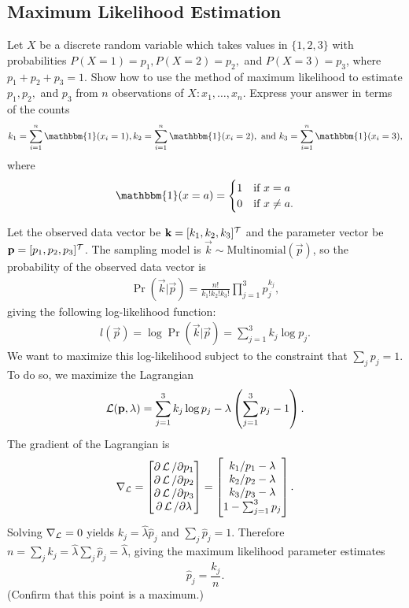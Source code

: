 \subsection{Maximum Likelihood Estimation}
Let $X$ be a discrete random variable which takes values in $\{1, 2, 3\}$ with probabilities $P(X = 1) = p_1, P(X=2) = p_2,$ and $P(X = 3) = p_3$, where $p_1 + p_2 + p_3 = 1$.  Show how to use the method of maximum likelihood to estimate $p_1, p_2,$ and $p_3$ from $n$ observations of $X: x_1, \ldots, x_n$. Express your answer in terms of the counts $$k_1 = \sum_{i=1}^n \mathbbm{1}(x_i = 1), k_2 = \sum_{i=1}^n \mathbbm{1}(x_i = 2), \text{ and }k_3 = \sum_{i=1}^n \mathbbm{1}(x_i = 3),$$ where
$$\mathbbm{1}(x = a) =
\begin{cases}
1 & \text{if } x = a \\
0 & \text{if } x \neq a.
\end{cases}$$
\begin{mdframed}
  Let the observed data vector be $\mathbf k = [k_1,k_2,k_3]^\mathcal T$ and the parameter
  vector be $\mathbf p = [p_1, p_2, p_3]^\mathcal T$. The sampling model is
  $\vec k \sim \text{Multinomial}(\vec p)$, so the probability of the observed
  data vector is
  \begin{align*}
    \Pr(\vec k | \vec p) = \frac{n!}{k_1!k_2!k_3!}\prod_{j=1}^3 p_j^{k_j},
  \end{align*}
  giving the following log-likelihood function:
  \begin{align*}
    l(\vec p) = \log \Pr(\vec k | \vec p) = \sum_{j=1}^3 k_j \log p_j.
  \end{align*}
  We want to maximize this log-likelihood subject to the constraint that
  $\sum_j p_j = 1$. To do so, we maximize the Lagrangian
  \begin{align*}
    \operatorname{\mathcal{L}}(\mathbf p, \lambda) = \sum_{j=1}^3 k_j \log p_j - \lambda\left(\sum_{j=1}^3 p_j - 1\right).
  \end{align*}
  The gradient of the Lagrangian is
  \begin{align*}
    \nabla_{\operatorname{\mathcal{L}}} =
    \begin{bmatrix}
      \partial \operatorname{\mathcal{L}} / \partial p_1\\
      \partial \operatorname{\mathcal{L}} / \partial p_2\\
      \partial \operatorname{\mathcal{L}} / \partial p_3\\
      \partial \operatorname{\mathcal{L}} / \partial \lambda\\
    \end{bmatrix} =
    \begin{bmatrix}
      k_1/p_1 - \lambda\\
      k_2/p_2 - \lambda\\
      k_3/p_3 - \lambda\\
      1 - \sum_{j=1}^3 p_j\\
    \end{bmatrix}.
  \end{align*}
  Solving $\nabla_{\operatorname{\mathcal{L}}} = 0$ yields $k_j = \widehat \lambda \widehat p_j$ and
  $\sum_j \widehat p_j = 1$. Therefore
  $n = \sum_j k_j = \widehat \lambda \sum_j \widehat p_j = \widehat \lambda$,
  giving the maximum likelihood parameter estimates
  $$
  \widehat p_j = \frac{k_j}{n}.
  $$
  (Confirm that this point is a maximum.)
\end{mdframed}


